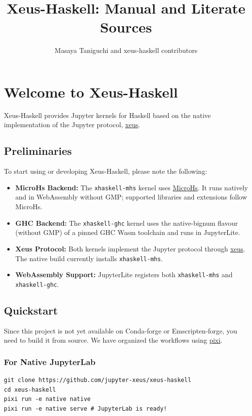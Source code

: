 \documentclass[11pt]{scrartcl}
\title{Xeus-Haskell: Manual and Literate Sources}
\author{Masaya Taniguchi and xeus-haskell contributors}
\date{}
\begin{document}
\maketitle
\tableofcontents
\newpage

\section{Welcome to Xeus-Haskell}


Xeus-Haskell provides Jupyter kernels for Haskell based on the native implementation of the Jupyter protocol, \href{https://github.com/jupyter-xeus/xeus}{xeus}.
\subsection{Preliminaries}


To start using or developing Xeus-Haskell, please note the following:
\begin{itemize}
\item \textbf{MicroHs Backend:} The \texttt{xhaskell-mhs} kernel uses \href{https://github.com/augustss/MicroHs}{MicroHs}. It runs natively and in WebAssembly without GMP; supported libraries and extensions follow MicroHs.
\item \textbf{GHC Backend:} The \texttt{xhaskell-ghc} kernel uses the native-bignum flavour (without GMP) of a pinned GHC Wasm toolchain and runs in JupyterLite.
\item \textbf{Xeus Protocol:} Both kernels implement the Jupyter protocol through \href{https://github.com/jupyter-xeus/xeus}{xeus}. The native build currently installs \texttt{xhaskell-mhs}.
\item \textbf{WebAssembly Support:} JupyterLite registers both \texttt{xhaskell-mhs} and \texttt{xhaskell-ghc}.
\end{itemize}


\subsection{Quickstart}


Since this project is not yet available on Conda-forge or Emscripten-forge, you need to build it from source. We have organized the workflows using \href{https://pixi.sh}{pixi}.
\subsubsection{For Native JupyterLab}


\begin{verbatim}
git clone https://github.com/jupyter-xeus/xeus-haskell
cd xeus-haskell
pixi run -e native native
pixi run -e native serve # JupyterLab is ready!
\end{verbatim}
\end{document}
